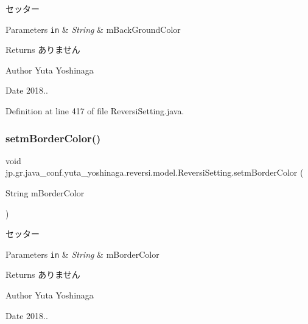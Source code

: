 セッター 


\begin{DoxyParams}[1]{Parameters}
\mbox{\tt in}  & {\em String} & m\+Back\+Ground\+Color \\
\hline
\end{DoxyParams}
\begin{DoxyReturn}{Returns}
ありません 
\end{DoxyReturn}
\begin{DoxyAuthor}{Author}
Yuta Yoshinaga 
\end{DoxyAuthor}
\begin{DoxyDate}{Date}
2018.. 
\end{DoxyDate}


Definition at line 417 of file Reversi\+Setting.\+java.

\mbox{\label{classjp_1_1gr_1_1java__conf_1_1yuta__yoshinaga_1_1reversi_1_1model_1_1_reversi_setting_a97fd27ecb82ec6aeb111d3439d246c00}} 
\subsubsection{\texorpdfstring{setm\+Border\+Color()}{setmBorderColor()}}
{\footnotesize\ttfamily void jp.\+gr.\+java\+\_\+conf.\+yuta\+\_\+yoshinaga.\+reversi.\+model.\+Reversi\+Setting.\+setm\+Border\+Color (\begin{DoxyParamCaption}\item[{String}]{m\+Border\+Color }\end{DoxyParamCaption})}



セッター 


\begin{DoxyParams}[1]{Parameters}
\mbox{\tt in}  & {\em String} & m\+Border\+Color \\
\hline
\end{DoxyParams}
\begin{DoxyReturn}{Returns}
ありません 
\end{DoxyReturn}
\begin{DoxyAuthor}{Author}
Yuta Yoshinaga 
\end{DoxyAuthor}
\begin{DoxyDate}{Date}
2018.. 
\end{DoxyDate}


